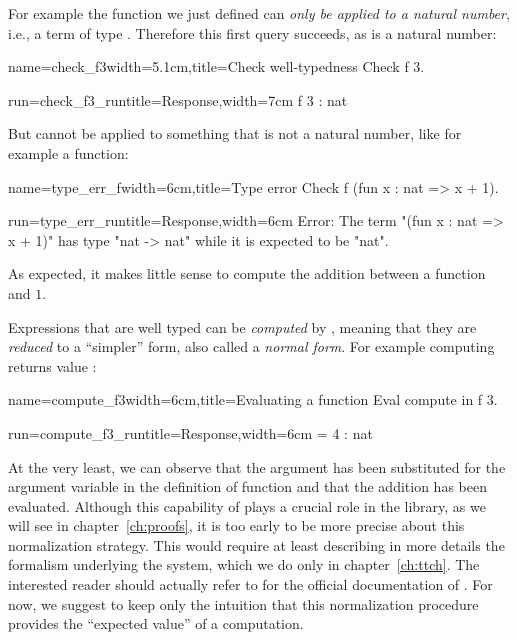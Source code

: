 For example the function  we just defined can \emph{only be
  applied to a natural number}, i.e., a term of type . Therefore
this first query succeeds, as  is a natural number:

\begin{coq}{name=check_f3}{width=5.1cm,title=Check well-typedness}
Check f 3.
\end{coq}
\begin{coqout}{run=check_f3_run}{title=Response,width=7cm}
 f 3 : nat
\end{coqout}
But  cannot be applied to something that is not a natural number,
like for example a function:

\begin{coq}{name=type_err_f}{width=6cm,title=Type error}
Check f (fun x : nat => x + 1).
$~$
$~$
\end{coq}
\begin{coqout}{run=type_err_run}{title=Response,width=6cm}
Error:
The term "(fun x : nat => x + 1)"
has type "nat -> nat" while it is
expected to be "nat".
\end{coqout}
As expected, it makes little sense to compute the addition between
a function and $1$.

Expressions that are well typed can be \emph{computed} by \Coq{},
meaning that they are \emph{reduced} to a ``simpler'' form, also
called a \emph{normal form}. For example computing  returns
value :

\begin{coq}{name=compute_f3}{width=6cm,title=Evaluating a function}
Eval compute in f 3.
\end{coq}
\begin{coqout}{run=compute_f3_run}{title=Response,width=6cm}
 = 4 : nat
\end{coqout}

At the very least, we can observe that the argument  has been
substituted for the argument variable in the definition of function
 and that the addition has been evaluated.
Although this capability of \Coq{} plays a crucial role
in the \mcbMC{} library, as we will see in chapter~\ref{ch:proofs}, it
is too early to be
more precise about this normalization strategy. This would require
at least describing in more details the formalism underlying the
\Coq{} system, which we do only in chapter~\ref{ch:ttch}. The
interested reader should actually refer to \cite[section
8.7.1]{Coq:manual} for the official documentation of .
For now, we suggest to keep only the intuition that this
normalization procedure provides the ``expected value'' of a
computation.

